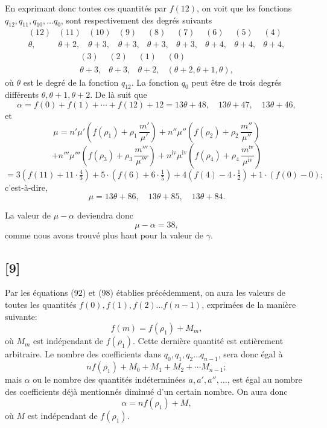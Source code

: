 \documentclass{article}
\begin{document}
En exprimant donc toutes ces quantités par $f(12)$, on voit que les fonctions $q_{12}, q_{11}, q_{10}, \ldots q_0$, sont respectivement des degrés suivants
\[ \begin{array}{ccccccccc} (12) & (11) & (10) & (9) & (8) & (7) & (6) & (5) & (4) \\ \theta, & \theta+2, & \theta+3, & \theta+3, & \theta+3, & \theta+3, & \theta+4, & \theta+4, & \theta+4, \end{array} \]
\[ \begin{array}{cccc} (3) & (2) & (1) & (0) \\ \theta+3, & \theta+3, & \theta+2, & (\theta+2, \theta+1, \theta), \end{array} \]
où $\theta$ est le degré de la fonction $q_{12}$. La fonction $q_0$ peut être de trois degrés différents $\theta, \theta+1, \theta+2$.
De là suit que
\[ \alpha = f(0)+f(1)+\cdots+f(12)+12 = 13\theta+48, \quad 13\theta+47, \quad 13\theta+46, \]
et
\[ \mu = n'\mu'\left(f(\rho_1)+\rho_1\,\frac{m'}{\mu'}\right) + n''\mu''\left(f(\rho_2)+\rho_2\,\frac{m''}{\mu''}\right) \]
\[ + n'''\mu'''\left(f(\rho_3)+\rho_3\,\frac{m'''}{\mu'''}\right) + n^{\text{iv}}\mu^{\text{iv}}\left(f(\rho_4)+\rho_4\,\frac{m^{\text{iv}}}{\mu^{\text{iv}}}\right) \]
\[ = 3\left(f(11)+11 \cdot \tfrac{4}{3}\right) + 5 \cdot \left(f(6)+6 \cdot \tfrac{1}{5}\right) + 4\left(f(4)-4 \cdot \tfrac{1}{2}\right) + 1 \cdot \left(f(0)-0\right); \]
c'est-à-dire,
\[ \mu = 13\theta+86, \quad 13\theta+85, \quad 13\theta+84. \]

La valeur de $\mu-\alpha$ deviendra donc
\[ \mu-\alpha = 38, \]
comme nous avons trouvé plus haut pour la valeur de $\gamma$.

\subsection*{[9]}

Par les équations (92) et (98) établies précédemment, on aura les valeurs de toutes les quantités $f(0), f(1), f(2) \ldots f(n-1)$, exprimées de la manière suivante:
\[ f(m) = f(\rho_1) + M_m, \tag{108} \]
où $M_m$ est indépendant de $f(\rho_1)$. Cette dernière quantité est entièrement arbitraire. Le nombre des coefficients dans $q_0, q_1, q_2 \ldots q_{n-1}$, sera donc égal à
\[ nf(\rho_1) + M_0+M_1+M_2+\cdots M_{n-1}; \tag{109} \]
mais $\alpha$ ou le nombre des quantités indéterminées $a, a', a'', \ldots$,
est égal au nombre des coefficients déjà mentionnés diminué d'un certain nombre. On aura donc
\[ \alpha = nf(\rho_1) + M, \tag{110} \]
où $M$ est indépendant de $f(\rho_1)$.
\end{document}
